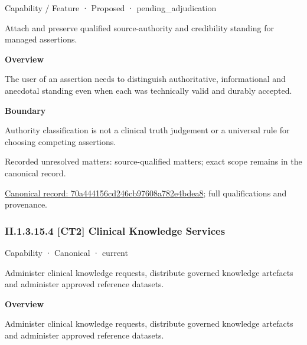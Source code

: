 \label{element:70a444156cd246cb97608a782e4bdea8}
{\small Capability / Feature · Proposed · pending\_adjudication}\par

Attach and preserve qualified source-authority and credibility standing for managed assertions.



\textbf{Overview}



The user of an assertion needs to distinguish authoritative, informational and anecdotal standing even when each was technically valid and durably accepted.



\textbf{Boundary}



Authority classification is not a clinical truth judgement or a universal rule for choosing competing assertions.


{\small Recorded unresolved matters: source-qualified matters; exact scope remains in the canonical record.}\par
{\footnotesize \href{../../../../continuum/strategy/capability/feature/70a444156cd246cb97608a782e4bdea8.md}{Canonical record: 70a444156cd246cb97608a782e4bdea8}; full qualifications and provenance.}\par
\subsubsection*{II.1.3.15.4 [CT2] Clinical Knowledge Services}
\label{navigation:II.1.3.15.4}

\label{element:bbd2bd21859f40e39963bdbe7a851686}
{\small Capability · Canonical · current}\par

Administer clinical knowledge requests, distribute governed knowledge artefacts and administer approved reference datasets.



\textbf{Overview}



Administer clinical knowledge requests, distribute governed knowledge artefacts and administer approved reference datasets.



